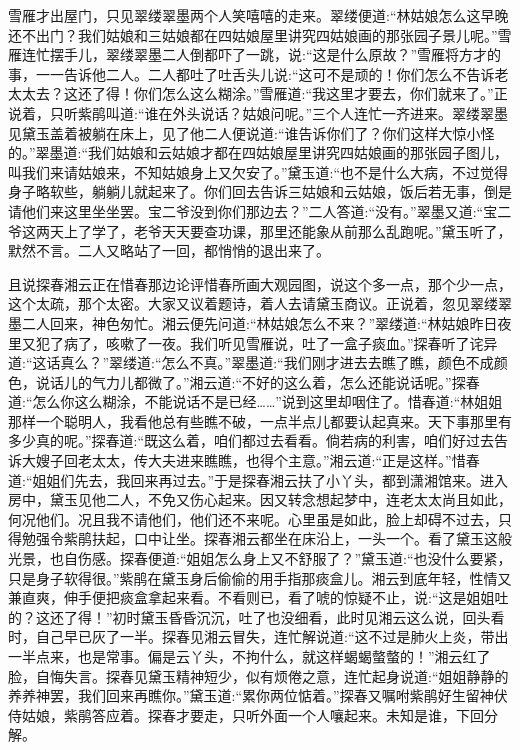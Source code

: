 \begin{parag}
    雪雁才出屋门，只见翠缕翠墨两个人笑嘻嘻的走来。翠缕便道:“林姑娘怎么这早晚还不出门？我们姑娘和三姑娘都在四姑娘屋里讲究四姑娘画的那张园子景儿呢。”雪雁连忙摆手儿，翠缕翠墨二人倒都吓了一跳，说:“这是什么原故？”雪雁将方才的事，一一告诉他二人。二人都吐了吐舌头儿说:“这可不是顽的！你们怎么不告诉老太太去？这还了得！你们怎么这么糊涂。”雪雁道:“我这里才要去，你们就来了。”正说着，只听紫鹃叫道:“谁在外头说话？姑娘问呢。”三个人连忙一齐进来。翠缕翠墨见黛玉盖着被躺在床上，见了他二人便说道:“谁告诉你们了？你们这样大惊小怪的。”翠墨道:“我们姑娘和云姑娘才都在四姑娘屋里讲究四姑娘画的那张园子图儿，叫我们来请姑娘来，不知姑娘身上又欠安了。”黛玉道:“也不是什么大病，不过觉得身子略软些，躺躺儿就起来了。你们回去告诉三姑娘和云姑娘，饭后若无事，倒是请他们来这里坐坐罢。宝二爷没到你们那边去？”二人答道:“没有。”翠墨又道:“宝二爷这两天上了学了，老爷天天要查功课，那里还能象从前那么乱跑呢。”黛玉听了，默然不言。二人又略站了一回，都悄悄的退出来了。
\end{parag}


\begin{parag}
    且说探春湘云正在惜春那边论评惜春所画大观园图，说这个多一点，那个少一点，这个太疏，那个太密。大家又议着题诗，着人去请黛玉商议。正说着，忽见翠缕翠墨二人回来，神色匆忙。湘云便先问道:“林姑娘怎么不来？”翠缕道:“林姑娘昨日夜里又犯了病了，咳嗽了一夜。我们听见雪雁说，吐了一盒子痰血。”探春听了诧异道:“这话真么？”翠缕道:“怎么不真。”翠墨道:“我们刚才进去去瞧了瞧，颜色不成颜色，说话儿的气力儿都微了。”湘云道:“不好的这么着，怎么还能说话呢。”探春道:“怎么你这么糊涂，不能说话不是已经……”说到这里却咽住了。惜春道:“林姐姐那样一个聪明人，我看他总有些瞧不破，一点半点儿都要认起真来。天下事那里有多少真的呢。”探春道:“既这么着，咱们都过去看看。倘若病的利害，咱们好过去告诉大嫂子回老太太，传大夫进来瞧瞧，也得个主意。”湘云道:“正是这样。”惜春道:“姐姐们先去，我回来再过去。”于是探春湘云扶了小丫头，都到潇湘馆来。进入房中，黛玉见他二人，不免又伤心起来。因又转念想起梦中，连老太太尚且如此，何况他们。况且我不请他们，他们还不来呢。心里虽是如此，脸上却碍不过去，只得勉强令紫鹃扶起，口中让坐。探春湘云都坐在床沿上，一头一个。看了黛玉这般光景，也自伤感。探春便道:“姐姐怎么身上又不舒服了？”黛玉道:“也没什么要紧，只是身子软得很。”紫鹃在黛玉身后偷偷的用手指那痰盒儿。湘云到底年轻，性情又兼直爽，伸手便把痰盒拿起来看。不看则已，看了唬的惊疑不止，说:“这是姐姐吐的？这还了得！”初时黛玉昏昏沉沉，吐了也没细看，此时见湘云这么说，回头看时，自己早已灰了一半。探春见湘云冒失，连忙解说道:“这不过是肺火上炎，带出一半点来，也是常事。偏是云丫头，不拘什么，就这样蝎蝎螫螫的！”湘云红了脸，自悔失言。探春见黛玉精神短少，似有烦倦之意，连忙起身说道:“姐姐静静的养养神罢，我们回来再瞧你。”黛玉道:“累你两位惦着。”探春又嘱咐紫鹃好生留神伏侍姑娘，紫鹃答应着。探春才要走，只听外面一个人嚷起来。未知是谁，下回分解。
\end{parag}